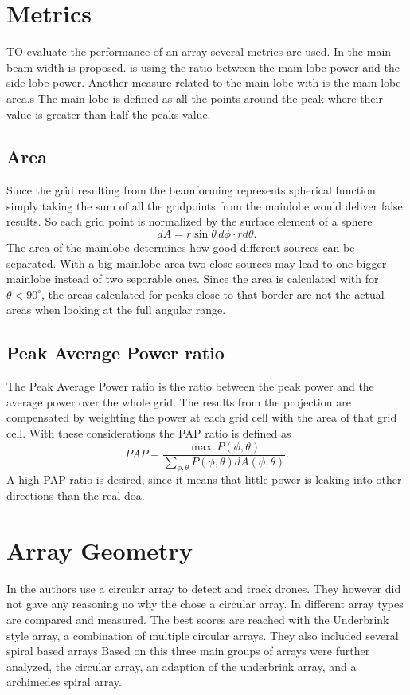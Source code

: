 \section{Metrics}
TO evaluate the performance of an array several metrics are used.
In  the
main beam-width is proposed.
 is using the ratio
between the main lobe power and the side lobe power.
Another measure related to the main lobe with is the main lobe area.s
The main lobe is defined as all the points around the peak where their value
is greater than half the peaks value. 

\subsection{Area}
Since the grid resulting from the beamforming represents spherical function
simply taking the sum of all the gridpoints from the mainlobe
would deliver false results.
So each grid point is normalized by the surface element of a sphere
\begin{equation}
	dA = r \sin\theta \, d\phi \cdot r d\theta.
\end{equation}
The area of the mainlobe determines how good different sources can be separated.
With a big mainlobe area two close sources may lead to one bigger mainlobe instead
of two separable ones.
Since the area is calculated with for $\theta < 90^\circ$, the areas calculated
for peaks close to that border are not the actual areas when looking at the 
full angular range.

\subsection{Peak Average Power ratio}
The Peak Average Power ratio is the ratio between the peak power and
the average power over the whole grid.
The results from the projection are compensated by weighting
the power at each grid cell with the area of that grid cell.
With these considerations the PAP ratio is defined as
\begin{equation}
	PAP = \frac{\max \, P(\phi, \theta)}{\sum_{\phi, \theta}^{} P(\phi, \theta) dA(\phi, \theta)}.
\end{equation}
A high PAP ratio is desired, since it means that little power is leaking 
into other directions than the real \acrshort{doa}.
\section{Array Geometry}
In  the authors use a circular array to detect and track drones.
They however did not gave any reasoning no why the chose a circular array.
\cite{bandkProducts}
In \cite{arr1} different array types are compared and measured.
The best scores are reached with the Underbrink style array, a combination
of multiple circular arrays.
They also included several spiral based arrays
Based on this three main groups of arrays were further analyzed,
the circular array, an adaption of the underbrink array, and a archimedes
spiral array.
